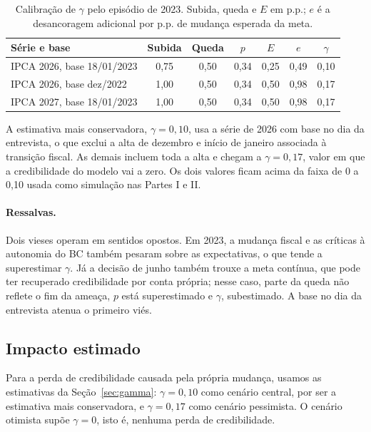 \documentclass[11pt,a4paper]{article}
\begin{document}
\begin{table}[H]
\centering
\begin{tabular}{lcccccc}
\toprule
Série e base & Subida & Queda & $p$ & $E$ & $e$ & $\gamma$ \\
\midrule
IPCA 2026, base 18/01/2023 & 0,75 & 0,50 & 0,34 & 0,25 & 0,49 & 0,10 \\
IPCA 2026, base dez/2022 & 1,00 & 0,50 & 0,34 & 0,50 & 0,98 & 0,17 \\
IPCA 2027, base 18/01/2023 & 1,00 & 0,50 & 0,34 & 0,50 & 0,98 & 0,17 \\
\bottomrule
\end{tabular}
\caption{Calibração de $\gamma$ pelo episódio de 2023. Subida, queda e $E$ em p.p.; $e$ é a desancoragem adicional por p.p. de mudança esperada da meta.}
\label{tab:gamma}
\end{table}

A estimativa mais conservadora, $\gamma=0{,}10$, usa a série de 2026 com base no dia da entrevista, o que exclui a alta de dezembro e início de janeiro associada à transição fiscal. As demais incluem toda a alta e chegam a $\gamma=0{,}17$, valor em que a credibilidade do modelo vai a zero. Os dois valores ficam acima da faixa de 0 a 0,10 usada como simulação nas Partes I e II.

\paragraph{Ressalvas.} Dois vieses operam em sentidos opostos. Em 2023, a mudança fiscal e as críticas à autonomia do BC também pesaram sobre as expectativas, o que tende a superestimar $\gamma$. Já a decisão de junho também trouxe a meta contínua, que pode ter recuperado credibilidade por conta própria; nesse caso, parte da queda não reflete o fim da ameaça, $p$ está superestimado e $\gamma$, subestimado. A base no dia da entrevista atenua o primeiro viés.

\subsection{Impacto estimado}

Para a perda de credibilidade causada pela própria mudança, usamos as estimativas da Seção~\ref{sec:gamma}: $\gamma=0{,}10$ como cenário central, por ser a estimativa mais conservadora, e $\gamma=0{,}17$ como cenário pessimista. O cenário otimista supõe $\gamma=0$, isto é, nenhuma perda de credibilidade.
\end{document}
